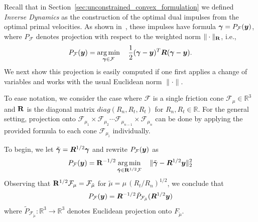 
Recall that in Section~\ref{sec:unconstrained_convex_formulation}
we defined \emph{Inverse Dynamics}
as the construction of the optimal dual impulses
from the optimal primal velocities.  As shown in~\cite{bib:todorov2014},
these impulses have formula ${\bm\gamma} = P_{\mathcal{F}}({\bm{y}})$, 
where $P_{\mathcal{F}}$ denotes projection
with respect to the weighted norm $\|\cdot\|_{{\mathbf{R}}}$, i.e.,
\[
P_{\mathcal{F}}({\bm{y}}) = \operatorname*{arg\,min}_{{\bm\gamma}\in\mathcal{F}} \quad \frac{1}{2}({\bm\gamma}-{\bm{y}})^T{\bm{R}}({\bm\gamma}-{\bm{y}}).
\]
We next show this projection is easily computed
if one first applies a change of variables and works with the usual Euclidean norm $\|\cdot\|$.


To ease notation, we consider the case where $\mathcal{F}$
is a single friction cone $\mathcal{F}_{\mu} \in \mathbb{R}^3$
and ${\mathbf{R}}$ is the diagonal matrix $diag(R_n, R_t, R_t)$
for $R_n, R_t \in \mathbb{R}$.  For the general setting, projection
onto $\mathcal{F}_{\mu_1} \times \mathcal{F}_{\mu_2} \cdots \mathcal{F}_{\mu_{n-1}}\times\mathcal{F}_{\mu_n}$
can be done  by applying the provided formula to
each cone $\mathcal{F}_{\mu_i}$ individually.

To begin, we let $\tilde{{\bm\gamma}}={\bm{R}}^{1/2}{\bm\gamma}$ 
and rewrite $P_{\mathcal{F}}({\bm{y}})$ as
\[
  P_{\mathcal{F}}({\bm{y}}) = {\mathbf{R}}^{-1/2} \operatorname*{arg\,min}_{\tilde {{\bm\gamma}}\in {\mathbf{R}}^{1/2} \mathcal{F}} \quad \Vert\tilde{{\bm\gamma}}-  {\bm{R}}^{1/2}{\bm{y}} \Vert_2^2
\]                                                                               
Observing that ${\mathbf{R}}^{1/2} \mathcal{F}_{\mu} = \mathcal{F}_{\tilde\mu}$ for $\tilde \mu =\mu\,(R_t/R_n)^{1/2}$,
we conclude that
\begin{eqnarray}
  P_\mathcal{F}(\vf{y})=\vf{R}^{-1/2} \tilde{P}_\mathcal{F_{\tilde\mu}}(\vf{R}^{1/2}\vf{y})
	\label{eq:local_optimization_problem_tilde}
\end{eqnarray}
where $\tilde{P}_\mathcal{F_{\tilde\mu}} : \mathbb{R}^3 \rightarrow \mathbb{R}^3$ denotes Euclidean projection onto $F_{\tilde\mu}$.

